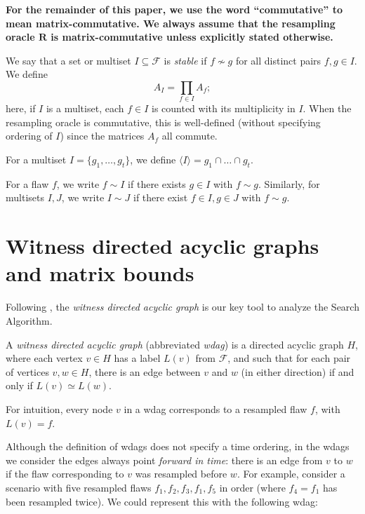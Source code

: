 \documentclass{toc}
\begin{document}
\textbf{For the remainder of this paper, we use the word ``commutative'' to mean matrix-commutative. We always assume that the resampling oracle $\mathbf R$ is matrix-commutative unless explicitly stated otherwise.}

\bigskip



We say that a set or multiset $I \subseteq \mathcal F$ is \emph{stable} if $f \not \sim g$ for all distinct pairs $f, g \in I$. We define
$$
A_I = \prod_{f \in I} A_f;
$$
here, if $I$ is a multiset, each $f \in I$ is counted  with its multiplicity in $I$. When the resampling oracle is commutative, this is well-defined (without specifying ordering of $I$) since the matrices $A_f$ all commute.

For a
%
 multiset $I = \{g_1, \dots, g_t \}$, we define $\langle I \rangle = g_1 \cap \dots \cap g_t$.  %
%
%

For a flaw $f$, we write $f \sim I$ if there exists
%
$g \in I$ with $f \sim g$. Similarly, for 
%
 multisets $I, J$, we write $I \sim J$ if there exist $f \in I, g \in J$ with $f \sim g$.

\section{Witness directed acyclic graphs and matrix bounds}\label{WitnessTree-sec}

Following \cite{ParallelHarrisHaeupler}, the  \emph{witness directed acyclic graph}
is our key tool to analyze the Search Algorithm.
\begin{definition}
  A  \emph{witness directed acyclic graph} (abbreviated \emph{wdag}) is a directed acyclic graph $H$, where each vertex $v \in H$ %
  has a label $L(v)$ from $\mathcal F$, and such that
%
for each pair  %
of vertices $v, w \in H$, there is an edge between $v$ and $w$ (in either direction) if and only if $L(v) \simeq L(w)$.  
\end{definition}

%

  For intuition, every node $v$ in a wdag corresponds to a resampled flaw $f$, with $L(v) = f$. 
  
  Although the definition of wdags does not specify a time ordering, in the wdags we consider the edges always point %
   \emph{forward in time}: there is an edge from $v$ to $w$ if the flaw corresponding to $v$ was resampled before $w$. For example, consider a scenario with five resampled flaws $f_1, f_2, f_3, f_1, f_5$ in order (where $f_4 = f_1$ has been resampled twice). We could represent this with the following wdag:
\end{document}
